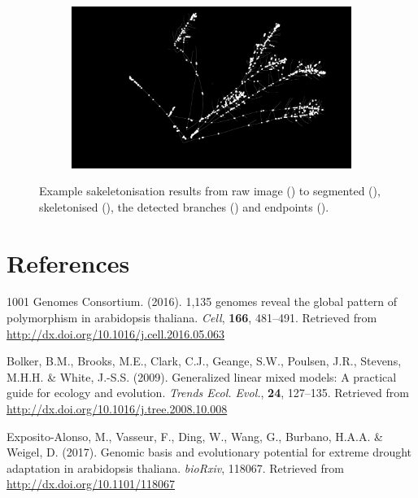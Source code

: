 \documentclass[12pt,]{article}
\begin{document}
\begin{figure}
\begin{subfigure}[t]{0.45\textwidth}
        \caption{} \label{fig:ep}
    \end{subfigure}
    \begin{subfigure}[t]{0.45\textwidth}
        \centering
        \includegraphics[width=\linewidth]{../figs/P1060902.JPG_proc_branches.jpeg}
        \caption{} \label{fig:bp}
    \end{subfigure}
\caption{Example sakeletonisation results from raw image () to segmented (), skeletonised (), the detected branches () and endpoints ().}
\label{fig:skeletonisation}
\end{figure}

\pagebreak

\section{References}\label{references}



\hypertarget{refs}{}
\hypertarget{ref-1001_Genomes_Consortium2016-nw}{}
1001 Genomes Consortium. (2016). 1,135 genomes reveal the global pattern
of polymorphism in arabidopsis thaliana. \emph{Cell}, \textbf{166},
481--491. Retrieved from
\url{http://dx.doi.org/10.1016/j.cell.2016.05.063}

\hypertarget{ref-Bolker2009-by}{}
Bolker, B.M., Brooks, M.E., Clark, C.J., Geange, S.W., Poulsen, J.R.,
Stevens, M.H.H. \& White, J.-S.S. (2009). Generalized linear mixed
models: A practical guide for ecology and evolution. \emph{Trends Ecol.
Evol.}, \textbf{24}, 127--135. Retrieved from
\url{http://dx.doi.org/10.1016/j.tree.2008.10.008}

\hypertarget{ref-Exposito-Alonso2017-ob}{}
Exposito-Alonso, M., Vasseur, F., Ding, W., Wang, G., Burbano, H.A.A. \&
Weigel, D. (2017). Genomic basis and evolutionary potential for extreme
drought adaptation in arabidopsis thaliana. \emph{bioRxiv}, 118067.
Retrieved from \url{http://dx.doi.org/10.1101/118067}
\end{document}
